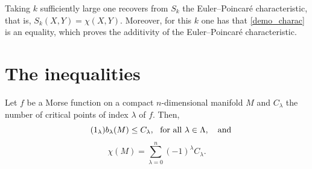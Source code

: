 \begin{remark}
\label{demo_adit_euler}
    Taking $k$ sufficiently large one recovers from $S_k$ the Euler--Poincaré characteristic, that is, $S_k(X,Y)=\chi(X,Y)$. Moreover, for this $k$ one has that \ref{demo_charac} is an equality, which proves the additivity of the Euler--Poincaré characteristic.
\end{remark}

\bigskip

\section{The inequalities}
\label{sec:desigmorse}
\begin{theorem}
\label{weak_morse_desig}
    Let $f$ be a Morse function on a compact $n$-dimensional manifold $M$  and $C_{\lambda}$ the number of critical points of index $\lambda$ of $f$. Then,
    \begin{equation}
    \label{weak_morse_desig1}
    \tag{$1_{\lambda}$}
        b_{\lambda}(M) \le C_{\lambda},~\text{ for all } \lambda\in\Lambda, ~~\text{ and }~~ %
    \end{equation}
    \begin{equation}
    \label{weak_morse_desig2}
    \tag{2}
        \chi(M) = \sum_{\lambda=0}^{n} (-1)^{\lambda} C_{\lambda}.
    \end{equation}
\end{theorem}
